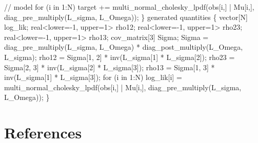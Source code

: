 \documentclass[
  12pt,
  letterpaper,
  DIV=11,
  numbers=noendperiod]{scrartcl}
\newenvironment{Shaded}{\begin{snugshade}}{\end{snugshade}}
\newcommand{\CommentTok}[1]{\textcolor[rgb]{0.37,0.37,0.37}{#1}}
\newcommand{\ControlFlowTok}[1]{\textcolor[rgb]{0.00,0.23,0.31}{#1}}
\newcommand{\DataTypeTok}[1]{\textcolor[rgb]{0.68,0.00,0.00}{#1}}
\newcommand{\DecValTok}[1]{\textcolor[rgb]{0.68,0.00,0.00}{#1}}
\newcommand{\KeywordTok}[1]{\textcolor[rgb]{0.00,0.23,0.31}{#1}}
\newcommand{\NormalTok}[1]{\textcolor[rgb]{0.00,0.23,0.31}{#1}}
\begin{document}
\begin{Shaded}
\begin{Highlighting}[]
  \CommentTok{// model}
  \ControlFlowTok{for}\NormalTok{ (i }\ControlFlowTok{in} \DecValTok{1}\NormalTok{:N)}
     \KeywordTok{target +=}\NormalTok{ multi\_normal\_cholesky\_lpdf(obs[i,] | Mu[i,], diag\_pre\_multiply(L\_sigma, L\_Omega));}
\NormalTok{\}}
\KeywordTok{generated quantities}\NormalTok{ \{}
  \DataTypeTok{vector}\NormalTok{[N] log\_lik;}
  \DataTypeTok{real}\NormalTok{\textless{}}\KeywordTok{lower}\NormalTok{={-}}\DecValTok{1}\NormalTok{, }\KeywordTok{upper}\NormalTok{=}\DecValTok{1}\NormalTok{\textgreater{} rho12;}
  \DataTypeTok{real}\NormalTok{\textless{}}\KeywordTok{lower}\NormalTok{={-}}\DecValTok{1}\NormalTok{, }\KeywordTok{upper}\NormalTok{=}\DecValTok{1}\NormalTok{\textgreater{} rho23;}
  \DataTypeTok{real}\NormalTok{\textless{}}\KeywordTok{lower}\NormalTok{={-}}\DecValTok{1}\NormalTok{, }\KeywordTok{upper}\NormalTok{=}\DecValTok{1}\NormalTok{\textgreater{} rho13;}
  \DataTypeTok{cov\_matrix}\NormalTok{[}\DecValTok{3}\NormalTok{] Sigma;}
\NormalTok{  Sigma = diag\_pre\_multiply(L\_sigma, L\_Omega)}
\NormalTok{     * diag\_post\_multiply(L\_Omega\textquotesingle{}, L\_sigma);}
\NormalTok{  rho12 = Sigma[}\DecValTok{1}\NormalTok{, }\DecValTok{2}\NormalTok{] * inv(L\_sigma[}\DecValTok{1}\NormalTok{] * L\_sigma[}\DecValTok{2}\NormalTok{]);}
\NormalTok{  rho23 = Sigma[}\DecValTok{2}\NormalTok{, }\DecValTok{3}\NormalTok{] * inv(L\_sigma[}\DecValTok{2}\NormalTok{] * L\_sigma[}\DecValTok{3}\NormalTok{]);}
\NormalTok{  rho13 = Sigma[}\DecValTok{1}\NormalTok{, }\DecValTok{3}\NormalTok{] * inv(L\_sigma[}\DecValTok{1}\NormalTok{] * L\_sigma[}\DecValTok{3}\NormalTok{]);}
  \ControlFlowTok{for}\NormalTok{ (i }\ControlFlowTok{in} \DecValTok{1}\NormalTok{:N)}
\NormalTok{   log\_lik[i] = multi\_normal\_cholesky\_lpdf(obs[i,] | Mu[i,], diag\_pre\_multiply(L\_sigma, L\_Omega));}
\NormalTok{ \}}
\end{Highlighting}
\end{Shaded}

\hypertarget{references}{%
\section*{References}\label{references}}
\end{document}
